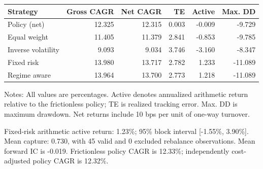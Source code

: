 \documentclass[11pt,a4paper]{article}
\begin{document}
\begin{center}\begin{minipage}{\textwidth}\small
{}\label{tab-holdout}
\begin{tabular*}{\textwidth}{@{\extracolsep{\fill}}lrrrrr@{}}\toprule Strategy & Gross CAGR & Net CAGR & TE & Active & Max. DD\\\midrule

Policy (net) & 12.325 & 12.315 & 0.003 & -0.009 & -9.729\\

Equal weight & 11.405 & 11.379 & 2.841 & -0.853 & -9.785\\

Inverse volatility & 9.093 & 9.034 & 3.746 & -3.160 & -8.347\\

Fixed risk & 13.980 & 13.717 & 2.782 & 1.233 & -11.089\\

Regime aware & 13.964 & 13.700 & 2.773 & 1.218 & -11.089\\

\bottomrule\end{tabular*}\par\vspace{4pt}\footnotesize\noindent Notes: All values are percentages. Active denotes annualized arithmetic return relative to the frictionless policy; TE is realized tracking error. Max. DD is maximum drawdown. Net returns include 10 bps per unit of one-way turnover.\end{minipage}\end{center}

Fixed-risk arithmetic active return: 1.23\%; 95\% block interval [-1.55\%, 3.90\%]. Mean capture: 0.730, with 45 valid and 0 excluded rebalance observations. Mean forward IC is -0.019. Frictionless policy CAGR is 12.33\%; independently cost-adjusted policy CAGR is 12.32\%.
\end{document}
